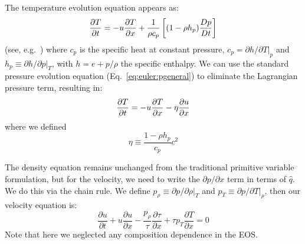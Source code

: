 The temperature evolution equation appears as:
\begin{equation}
\frac{\partial T}{\partial t} = -u{\frac{{\partial T}}{\partial x}} +
  \frac{1}{\rho c_p} \left [ (1 - \rho h_p) \frac{Dp}{Dt} \right ]
\end{equation}
(see, e.g.\ \cite{ABRZ:I}) where $c_p$ is the specific heat at
constant pressure, $c_p = \partial h/\partial T|_p$ and $h_p \equiv
\partial h / \partial p |_T$, with $h = e + p/\rho$ the specific
enthalpy.  We can use the standard pressure evolution equation
(Eq.~\ref{eq:euler:pgeneral}) to eliminate the Lagrangian pressure term,
resulting in:
\begin{equation}
\frac{\partial T}{\partial t} = -u{\frac{{\partial T}}{\partial x}} - \eta {\frac{{\partial u}}{\partial x}}
\end{equation}
where we defined
\begin{equation}
\eta \equiv \frac{1 - \rho h_p}{c_p} c^2
\end{equation}

The density equation remains unchanged from the traditional primitive
variable formulation, but for the velocity, we need to write the
$\partial p/\partial x$ term in terms of $\hat{q}$.  We do this via
the chain rule.  We define $p_\rho \equiv {\partial p}/{\partial \rho}
|_T$ and $p_T \equiv {\partial p}/{\partial T} |_\rho$, then our
velocity equation is:
\begin{equation}
\frac{\partial u}{\partial t} + u \frac{\partial u}{\partial x} - \frac{p_\rho}{\tau} \frac{\partial \tau}{\partial x} + {\tau p_T} \frac{\partial T}{\partial x} = 0
\end{equation}
Note that here we neglected any composition dependence in the EOS.

